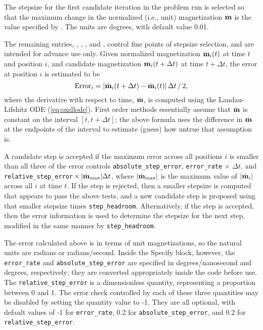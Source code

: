 \begin{description}
The stepsize for the first candidate iteration in the problem run is
selected so that the maximum change in the normalized (i.e., unit)
magnetization $\textbf{m}$ is the value specified by .  The
units are degrees, with default value 0.01.

The remaining entries, ,
, , and
, control fine points of stepsize selection,
and are intended for advance use only.  Given normalized magnetization
$\textbf{m}_i(t)$ at time $t$ and position $i$, and candidate magnetization
$\textbf{m}_i(t+\Delta t)$ at time $t+\Delta t$, the error at position $i$ is
estimated to be
\begin{displaymath}
\htmlimage{antialias}
\mbox{Error}_i =
  \left|\dot{\vm}_i(t+\Delta t) - \dot{\vm}_i(t)\right|\Delta t
      \,/\,2,
\end{displaymath}
where the derivative with respect to time, $\dot{\textbf{m}}$, is computed
using the Landau-Lifshitz ODE (\ref{eq:oxsllode}).  First order methods
essentially assume that $\dot{\textbf{m}}$ is constant on the interval
$[t,t+\Delta t]$; the above formula uses the difference in $\dot{\textbf{m}}$
at the endpoints of the interval to estimate (guess) how untrue that
assumption is.

A candidate step is accepted if the maximum error across all positions
$i$ is smaller than all three of the error controls
\texttt{absolute\_step\_error},
\texttt{error\_rate}$\,\times\,\Delta t$, and
\texttt{relative\_step\_error}$\,\times\,|\dot{\textbf{m}}_{\rm
max}|\Delta t$, where $|\dot{\textbf{m}}_{\rm max}|$ is the maximum value of
$|\dot{\textbf{m}}_i|$ across all $i$ at time $t$.  If the step is rejected,
then a smaller stepsize is computed that appears to pass the above
tests, and a new candidate step is proposed using that smaller stepsize
times \texttt{step\_headroom}.  Alternatively, if the step is accepted,
then the error information is used to determine the stepsize for the
next step, modified in the same manner by \texttt{step\_headroom}.

The error calculated above is in terms of unit magnetizations, so the
natural units are radians or radians/second.  Inside the Specify block,
however, the \texttt{error\_rate} and \texttt{absolute\_step\_error} are
specified in degrees/nanosecond and degrees, respectively; they are
converted appropriately inside the code before use.  The
\texttt{relative\_step\_error} is a dimensionless quantity, representing a
proportion between 0 and 1.  The error check controlled by each of these
three quantities may be disabled by setting the quantity value to -1.
They are all optional, with default values of -1 for \texttt{error\_rate},
0.2 for \texttt{absolute\_step\_error}, and 0.2 for
\texttt{relative\_step\_error}.


\end{description}
